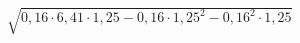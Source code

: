 \begin{ex}[type=calculate]
	\begin{condition}
		\( \sqrt{0,16\cdot6,41\cdot1,25-0,16\cdot1,25^2-0,16^2\cdot1,25} \)
	\end{condition}
\end{ex}